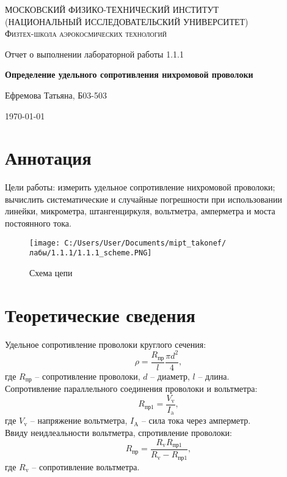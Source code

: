 \documentclass[a4paper]{article}
\begin{document}
\begin{titlepage}
	\centering
	{\scshape\Large МОСКОВСКИЙ ФИЗИКО-ТЕХНИЧЕСКИЙ ИНСТИТУТ \\
	(НАЦИОНАЛЬНЫЙ ИССЛЕДОВАТЕЛЬСКИЙ УНИВЕРСИТЕТ)\\ %
    Физтех-школа аэрокосмических технологий}
	
	\vspace{4cm} %
	{\LARGE Отчет о выполнении лабораторной работы 1.1.1}
	
	\vspace{1cm} %
	{\huge\bf Определение удельного сопротивления нихромовой проволоки}
	
	\vspace{1cm} %
	\vfill %
	
    \begin{flushright} %
	   {\LARGE Ефремова Татьяна, Б03-503}
    \end{flushright}
    \vfill

	\today %
\end{titlepage}

\section{Аннотация}
Цели работы: измерить удельное сопротивление нихромовой проволоки; вычислить систематические и случайные погрешности при использовании линейки, микрометра, штангенциркуля, вольтметра, амперметра и моста постоянного тока.

\begin{wrapfigure}{R}{0.3\textwidth}
    \texttt{[image: C:/Users/User/Documents/mipt\_takonef/лабы/1.1.1/1.1.1\_scheme.PNG]}
    \caption{Схема цепи}
\end{wrapfigure}

\section{Теоретические сведения}
Удельное сопротивление проволоки круглого сечения:
\begin{equation}
\rho = \frac{R_\text{пр}}{l}\frac{\pi d^2}{4},
\end{equation} где $R_\text{пр}$ -- сопротивление проволоки, $d$ -- диаметр, $l$ -- длина. \\
Сопротивление параллельного соединения проволоки и вольтметра:
\begin{equation}
R_\text{пр1} = \frac{V_\text{v}}{I_\text{a}},    
\end{equation}
где  $V_\text{v}$ -- напряжение вольтметра, $I_\text{A}$ -- сила тока через амперметр. \\
Ввиду неидлеальности вольтметра, спротивление проволоки:
\begin{equation}
    R_\text{пр} =\frac{R_\text{v}R_\text{пр1}}{R_\text{v}-R_\text{пр1}},
\end{equation}
где $R_\text{v}$ -- сопротивление вольтметра.
\end{document}
